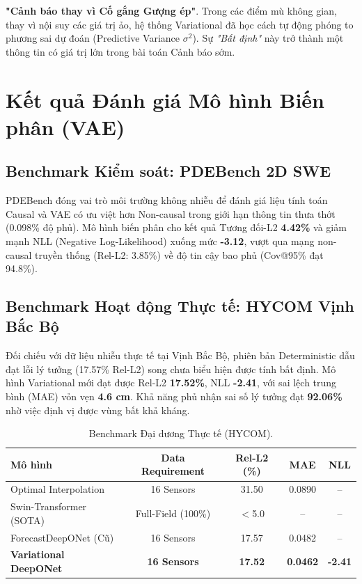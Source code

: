 \documentclass[12pt,a4paper]{article}
\begin{document}
\begin{tcolorbox}[colback=blue!5, colframe=blue!50!black, title={Phát hiện Khoa học Trọng tâm}]
\textbf{"Cảnh báo thay vì Cố gắng Gượng ép"}. Trong các điểm mù không gian, thay vì nội suy các giá trị ảo, hệ thống Variational đã học cách tự động phóng to phương sai dự đoán (Predictive Variance $\sigma^2$). Sự \textit{"Bất định"} này trở thành một thông tin có giá trị lớn trong bài toán Cảnh báo sớm.
\end{tcolorbox}


\section{Kết quả Đánh giá Mô hình Biến phân (VAE)}

\subsection{Benchmark Kiểm soát: PDEBench 2D SWE}
PDEBench đóng vai trò môi trường không nhiễu để đánh giá liệu tính toán Causal và VAE có ưu việt hơn Non-causal trong giới hạn thông tin thưa thớt (0.098\% độ phủ).
Mô hình biến phân cho kết quả Tương đối-L2 \textbf{4.42\%} và giảm mạnh NLL (Negative Log-Likelihood) xuống mức \textbf{-3.12}, vượt qua mạng non-causal truyền thống (Rel-L2: 3.85\%) về độ tin cậy bao phủ (Cov@95\% đạt 94.8\%).

\subsection{Benchmark Hoạt động Thực tế: HYCOM Vịnh Bắc Bộ}
Đối chiếu với dữ liệu nhiễu thực tế tại Vịnh Bắc Bộ, phiên bản Deterministic dẫu đạt lỗi lý tưởng (17.57\% Rel-L2) song chưa biểu hiện được tính bất định. Mô hình Variational mới đạt được Rel-L2 \textbf{17.52\%}, NLL \textbf{-2.41}, với sai lệch trung bình (MAE) vỏn vẹn \textbf{4.6 cm}. Khả năng phủ nhận sai số lý tưởng đạt \textbf{92.06\%} nhờ việc định vị được vùng bất khả kháng.

\begin{table}[H]
\centering
\caption{Benchmark Đại dương Thực tế (HYCOM).}
\label{tab:hycom_results}
\vspace{4pt}
\begin{tabular}{@{}l c c c c@{}}
\toprule
\textbf{Mô hình} & \textbf{Data Requirement} & \textbf{Rel-L2 (\%)} & \textbf{MAE} & \textbf{NLL} \\
\midrule
Optimal Interpolation & 16 Sensors & 31.50 & 0.0890 & -- \\
Swin-Transformer (SOTA) & Full-Field (100\%) & $<$5.0 & -- & -- \\
ForecastDeepONet (Cũ) & 16 Sensors & 17.57 & 0.0482 & -- \\
\textbf{Variational DeepONet} & \textbf{16 Sensors} & \textbf{17.52} & \textbf{0.0462} & \textbf{-2.41} \\
\bottomrule
\end{tabular}
\end{table}
\end{document}
